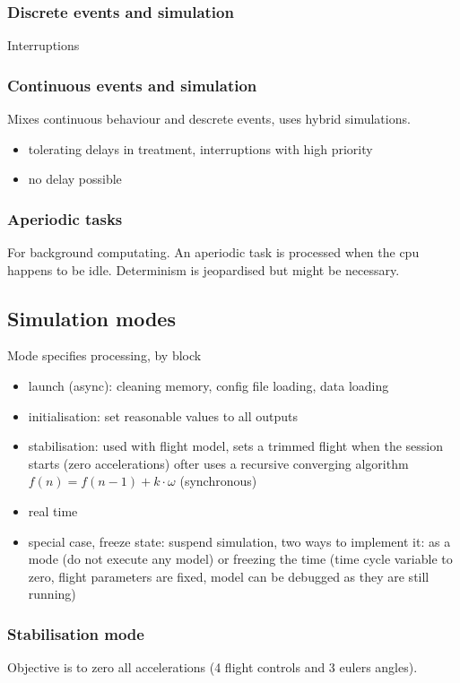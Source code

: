 \documentclass[10pt]{article}
\theoremstyle{plain}
\theoremstyle{definition}
\theoremstyle{remark}
\begin{document}
\subsubsection{Discrete events and simulation}
Interruptions

\subsubsection{Continuous events and simulation}
Mixes continuous behaviour and descrete events, uses hybrid simulations.
\begin{itemize}
	\item tolerating delays in treatment, interruptions with high priority
	\item no delay possible
\end{itemize}

\subsubsection{Aperiodic tasks}
For background computating. An aperiodic task is processed when the cpu happens
to be idle. Determinism is jeopardised but might be necessary.

\subsection{Simulation modes}
Mode specifies processing, by block
\begin{itemize}
	\item launch (async): cleaning memory, config file loading, data loading
	\item initialisation: set reasonable values to all outputs
	\item stabilisation: used with flight model, sets a trimmed flight when
		the session starts (zero accelerations) ofter uses a recursive
		converging algorithm \( f(n) = f(n-1) + k\cdot \omega \) (synchronous)
	\item real time
	\item special case, freeze state: suspend simulation, two ways to implement
		it: as a mode (do not execute any model) or freezing the time (time
		cycle variable to zero, flight parameters are fixed, model can be
		debugged as they are still running)
\end{itemize}

\subsubsection{Stabilisation mode}
Objective is to zero all accelerations (4 flight controls and 3 eulers angles).
\end{document}
